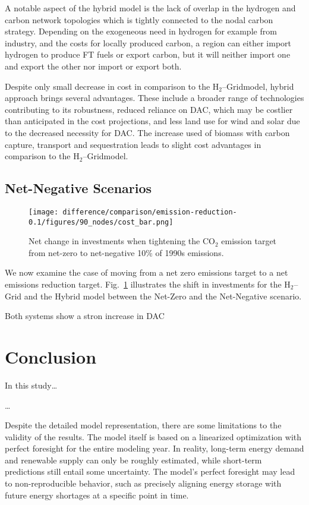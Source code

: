 \documentclass[twocolumn]{article}
\newcommand{\carbon}{CO$_2$}
\newcommand{\hydrogen}{H$_2$}
\newcommand{\hydrogengrid}{\hydrogen{}--Grid}
\begin{document}
A notable aspect of the hybrid model is the lack of overlap in the hydrogen and carbon network topologies which is tightly connected to the nodal carbon strategy. Depending on the exogeneous need in hydrogen for example from industry, and the costs for locally produced carbon, a region can either import hydrogen to produce FT fuels or export carbon, but it will neither import one and export the other nor import or export both.


Despite only small decrease in cost in comparison to the \hydrogengrid model, hybrid approach brings several advantages. These include a broader range of technologies contributing to its robustness, reduced reliance on DAC, which may be costlier than anticipated in the cost projections, and less land use for wind and solar due to the decreased necessity for DAC. The increase used of biomass with carbon capture, transport and sequestration leads to slight cost advantages in comparison to the \hydrogengrid model.



\subsection*{Net-Negative Scenarios}

\begin{figure}[htb!]
    \centering
    \texttt{[image: difference/comparison/emission-reduction-0.1/figures/90\_nodes/cost\_bar.png]}
    \caption[short]{Net change in investments when tightening the \carbon{} emission target from net-zero to net-negative 10\% of 1990s emissions.}
    \label{fig:net-negative_cost_bar}
\end{figure}


We now examine the case of moving from a net zero emissions target to a net emissions reduction target. Fig.~\ref{fig:net-negative_cost_bar} illustrates the shift in investments for the \hydrogengrid{} and the Hybrid model between the Net-Zero and the Net-Negative scenario.

Both systems show a stron increase in DAC


\section{Conclusion}
\label{sec:conclusion}



In this study\dots

\dots

Despite the detailed model representation, there are some limitations to the validity of the results. The model itself is based on a linearized optimization with perfect foresight for the entire modeling year. In reality, long-term energy demand and renewable supply can only be roughly estimated, while short-term predictions still entail some uncertainty. The model's perfect foresight may lead to non-reproducible behavior, such as precisely aligning energy storage with future energy shortages at a specific point in time.
\end{document}
